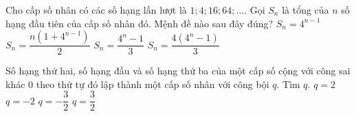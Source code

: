 \begin{ex}%
	Cho cấp số nhân có các số hạng lần lượt là $1;4;16;64;...$. Gọi $S_n$ là tổng của $n$ số hạng đầu tiên của cấp số nhân đó. Mệnh đề nào sau đây đúng?
	\choice
	{$S_n=4^{n-1}$}
	{$S_n=\dfrac{n\left(1+4^{n-1}\right)}{2}$}
	{\True $S_n=\dfrac{4^n-1}{3}$}
	{$S_n=\dfrac{4\left(4^n-1\right)}{3}$}
\end{ex}
\begin{ex}%
	Số hạng thứ hai, số hạng đầu và số hạng thứ ba của một cấp số cộng với công sai khác $0$ theo thứ tự đó lập thành một cấp số nhân với công bội $q$. Tìm $q$.
	\choice
	{$q=2$}
	{\True $q=-2$}
	{$q=-\dfrac{3}{2}$}
	{$q=\dfrac{3}{2}$}
\end{ex}
